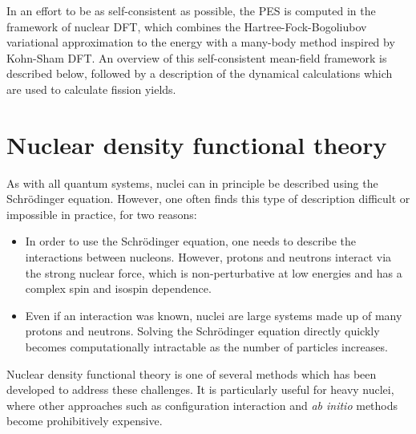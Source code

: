 
In an effort to be as self-consistent as possible, the PES is computed in the framework of nuclear DFT, which combines the Hartree-Fock-Bogoliubov variational approximation to the energy with a many-body method inspired by Kohn-Sham DFT. An overview of this self-consistent mean-field framework is described below, followed by a description of the dynamical calculations which are used to calculate fission yields.

\section{Nuclear density functional theory}
As with all quantum systems, nuclei can in principle be described using the Schr\"{o}dinger equation. However, one often finds this type of description difficult or impossible in practice, for two reasons:

\begin{itemize}
\item In order to use the Schr\"{o}dinger equation, one needs to describe the interactions between nucleons. However, protons and neutrons interact via the strong nuclear force, which is non-perturbative at low energies and has a complex spin and isospin dependence.%
\item Even if an interaction was known, nuclei are large systems made up of many protons and neutrons. Solving the Schr\"{o}dinger equation directly quickly becomes computationally intractable as the number of particles increases.
\end{itemize}

Nuclear density functional theory is one of several methods which has been developed to address these challenges. It is particularly useful for heavy nuclei, where other approaches such as configuration interaction and \textit{ab initio} methods become prohibitively expensive.

